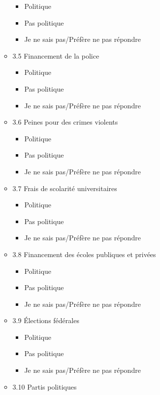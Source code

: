 \documentclass[
  letterpaper,
  DIV=11,
  numbers=noendperiod]{scrreprt}
\providecommand{\tightlist}{%
  \setlength{\itemsep}{0pt}\setlength{\parskip}{0pt}}\usepackage{longtable,booktabs,array}
\begin{document}
\begin{enumerate}
\begin{itemize}
    \begin{itemize}
    \tightlist
    \item
      Politique
    \item
      Pas politique
    \item
      Je ne sais pas/Préfère ne pas répondre
    \end{itemize}
  \item
    3.5 Financement de la police

    \begin{itemize}
    \tightlist
    \item
      Politique
    \item
      Pas politique
    \item
      Je ne sais pas/Préfère ne pas répondre
    \end{itemize}
  \item
    3.6 Peines pour des crimes violents

    \begin{itemize}
    \tightlist
    \item
      Politique
    \item
      Pas politique
    \item
      Je ne sais pas/Préfère ne pas répondre
    \end{itemize}
  \item
    3.7 Frais de scolarité universitaires

    \begin{itemize}
    \tightlist
    \item
      Politique
    \item
      Pas politique
    \item
      Je ne sais pas/Préfère ne pas répondre
    \end{itemize}
  \item
    3.8 Financement des écoles publiques et privées

    \begin{itemize}
    \tightlist
    \item
      Politique
    \item
      Pas politique
    \item
      Je ne sais pas/Préfère ne pas répondre
    \end{itemize}
  \item
    3.9 Élections fédérales

    \begin{itemize}
    \tightlist
    \item
      Politique
    \item
      Pas politique
    \item
      Je ne sais pas/Préfère ne pas répondre
    \end{itemize}
  \item
    3.10 Partis politiques


\end{itemize}
\end{enumerate}
\end{document}
